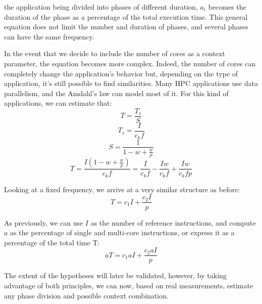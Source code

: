 the application being divided into phases of different duration, $a_i$  becomes the duration of the phase as a percentage of the total execution time. This general equation does not limit the number and duration of phases, and several phases can have the same frequency. 

In the event that we decide to include the number of cores as a context parameter, the equation becomes more complex. Indeed, the number of cores can completely change the application's behavior but, depending on the type of application, it's still possible to find similarities. Many HPC applications use data parallelism, and the Amdahl's law can model most of it. For this kind of applications, we can estimate that:
\begin{equation}
T=\frac{T_s}{S}
\end{equation}
\begin{equation}
T_s=\frac{I}{c_kf}
\end{equation}
\begin{equation}
S=\frac{1}{1-w+\frac{w}{p}}
\end{equation}
\begin{equation}
T=\frac{I(1-w+\frac{w}{p})}{c_kf}=\frac{I}{c_kf}-\frac{Iw}{c_kf}+\frac{Iw}{c_kfp}
\end{equation}


Looking at a fixed frequency, we arrive at a very similar structure as before:
\begin{equation}
T=c_1I+\frac{c_2I}{p}
\end{equation}


As previously, we can use $I$ as the number of reference instructions, and compute $a$ as the percentage of single and multi-core instructions, or express it as a percentage of the total time T:
\begin{equation}
aT=c_1aI+\frac{c_2aI}{p}
\end{equation}


The extent of the hypotheses will later be validated, however, by taking advantage of both principles, we can now, based on real measurements, estimate any phase division and possible context combination.




